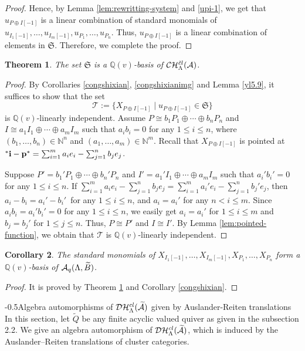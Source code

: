 \documentclass[reqno,12pt]{amsart}
\makeatletter
\numberwithin{equation}{section}
\theoremstyle{plain} %
\newtheorem{theorem}{\bf Theorem}[section]
\newtheorem{corollary}[theorem]{\bf Corollary}
\theoremstyle{definition} %
\renewcommand{\section}{\@startsection{section}{1}{0mm}
  {-\baselineskip}{0.5\baselineskip}{\bf\leftline}}
\makeatother
\begin{document}
\begin{proof}
Hence, by Lemma \ref{lem:rewritting-system} and \eqref{upi-1}, we get that $u_{P\oplus I[-1]}$ is a linear combination of standard monomials of $u_{I_1[-1]},\ldots, u_{I_m[-1]}, u_{P_1},\ldots, u_{P_n}$. Thus, $u_{P\oplus I[-1]}$ is a linear combination of elements in $\mathfrak{S}$. Therefore, we complete the proof.
\end{proof}



\begin{theorem}\label{pcabasis}
The set  $\mathfrak{S}$ is a $\mathbb{Q}(v)$-basis of $\mathcal {C}\mathcal {H}_\Lambda^{{\tilde{c}l}}({\mathcal{A}})$.
\end{theorem}
\begin{proof}

By Corollaries \ref{congshixian}, \ref{congshixianimg} and Lemma \ref{yl5.9}, it suffices to show that the set $$\mathscr{T}:=\{X_{P\oplus I[-1]}\mid u_{P\oplus I[-1]}\in \mathfrak{S}\}$$ is $\mathbb{Q}(v)$-linearly independent.
Assume $P\cong b_1P_1\oplus \cdots\oplus b_nP_n$ and $I\cong a_1I_1\oplus \cdots \oplus a_mI_m$ such that $a_ib_i=0$ for any $1\leq i\leq n$, where $(b_1,\ldots,b_n)\in \mathbb{N}^n$ and $(a_1,\ldots, a_m)\in \mathbb{N}^m$.
Recall that $X_{P\oplus I[-1]}$ is pointed at ${^\ast{\bf i}}-{\bf p}^\ast=\sum_{i=1}^ma_ie_i-\sum_{j=1}^nb_je_j$.

Suppose $P'=b_1'P_1\oplus \cdots \oplus b_n'P_n$ and $I'=a_1'I_1\oplus \cdots \oplus a_mI_m$ such that $a_i'b_i'=0$ for any $1\leq i\leq n$. If $\sum_{i=1}^ma_ie_i-\sum_{j=1}^nb_je_j=\sum_{i=1}^ma_i'e_i-\sum_{j=1}^nb_j'e_j$, then $a_i-b_i=a_i'-b_i'$~for any $1\leq i\leq n$, and $a_i=a_i'$ for any $n<i\leq m$. Since $a_ib_i=a_i'b_i'=0$ for any $1\leq i\leq n$, we easily get $a_i=a_i'$ for $1\leq i\leq m$ and $b_j=b_j'$ for $1\leq j\leq n$. Thus, $P\cong P'$ and $I\cong I'$. By Lemma \ref{lem:pointed-function}, we obtain that $\mathscr{T}$ is $\mathbb{Q}(v)$-linearly independent.
\end{proof}
\begin{corollary}\label{ttll51}
The standard monomials of $X_{I_1[-1]},\ldots, X_{I_m[-1]}, X_{P_1},\ldots, X_{P_n}$ form a $\mathbb{Q}(v)$-basis of $\mathcal{A}_q(\Lambda,\widetilde{B})$.
\end{corollary}
\begin{proof}
It is proved by Theorem \ref{pcabasis} and Corollary \ref{congshixian}.
\end{proof}

\section{Algebra automorphisms of $\mathcal {D}\mathcal {H}_\Lambda^{{cl}}(\widetilde{\mathcal{A}})$ given by Auslander-Reiten translations}
In this section, let $\widetilde{Q}$ be any finite acyclic valued quiver as given in the subsection 2.2. We give an algebra automorphism of $\mathcal {D}\mathcal {H}_\Lambda^{{cl}}(\widetilde{\mathcal{A}})$, which is induced by the Auslander--Reiten translations of cluster categories.
\end{document}
